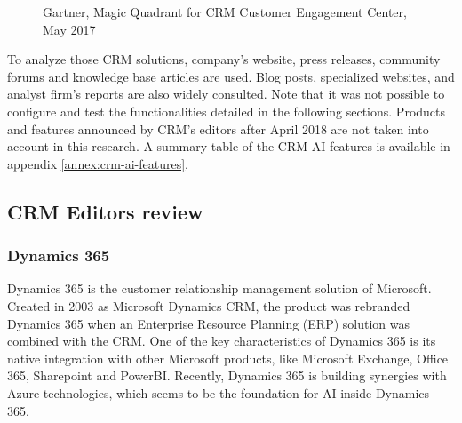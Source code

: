 \begin{figure}[!h]
\begin{minipage}[c]{0.50\linewidth}
        \captionsetup{margin=0.1cm}
        \caption[Magic Quadrant for the CRM Customer Engagement Center]{Gartner, Magic Quadrant for CRM Customer Engagement Center, May 2017}
        \label{fig:magic-quadrant-customer-engagement}
    \end{minipage}
\end{figure}

To analyze those CRM solutions, company's website, press releases, community forums and knowledge base articles are used. Blog posts, specialized websites, and analyst firm's reports are also widely consulted. Note that it was not possible to configure and test the functionalities detailed in the following sections. Products and features announced by CRM's editors after April 2018 are not taken into account in this research. A summary table of the CRM AI features is available in appendix \ref{annex:crm-ai-features}.

\subsection{CRM Editors review}
\label{sec:crm-editors-review}

\subsubsection*{Dynamics 365}
Dynamics 365 is the customer relationship management solution of Microsoft. Created in 2003 as Microsoft Dynamics CRM, the product was rebranded Dynamics 365 when an Enterprise Resource Planning (ERP) solution was combined with the CRM. One of the key characteristics of Dynamics 365 is its native integration with other Microsoft products, like Microsoft Exchange, Office 365, Sharepoint and PowerBI. Recently, Dynamics 365 is building synergies with Azure technologies, which seems to be the foundation for AI inside Dynamics 365. 

